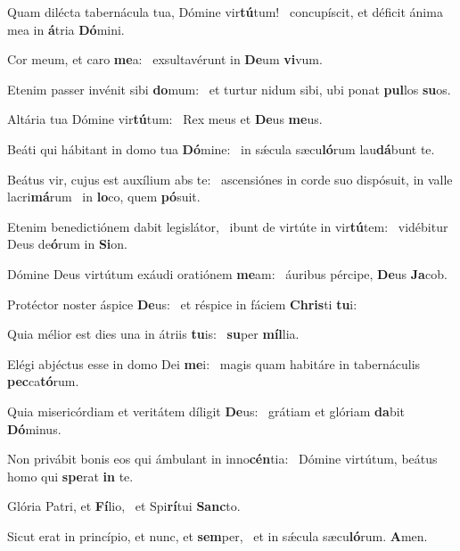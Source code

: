 \item Quam dilécta tabernácula tua, Dómine vir\textbf{tú}tum!~\psstar{} concupíscit, et déficit ánima mea in \textbf{á}tria \textbf{Dó}mini.
\item Cor meum, et caro \textbf{me}a:~\psstar{} exsultavérunt in \textbf{De}um \textbf{vi}vum.
\item Etenim passer invénit sibi \textbf{do}mum:~\psstar{} et turtur nidum sibi, ubi ponat \textbf{pul}los \textbf{su}os.
\item Altária tua Dómine vir\textbf{tú}\-tum:~\psstar{} Rex meus et \textbf{De}us \textbf{me}us.
\item Beáti qui hábitant in domo tua \textbf{Dó}mine:~\psstar{} in sǽcula sæcu\textbf{ló}rum lau\textbf{dá}bunt te.
\item Beátus vir, cujus est auxílium abs te:~\pscross{} ascensiónes in corde suo dispósuit, in valle lacri\textbf{má}rum~\psstar{} in \textbf{lo}co, quem \textbf{pó}suit.
\item Etenim benedictiónem dabit legislátor,~\pscross{} ibunt de virtúte in vir\textbf{tú}tem:~\psstar{} vidébitur Deus de\textbf{ó}rum in \textbf{Si}on.
\item Dómine Deus virtútum exáudi oratiónem \textbf{me}am:~\psstar{} áuribus pércipe, \textbf{De}us \textbf{Ja}cob.
\item Protéctor noster áspice \textbf{De}us:~\psstar{} et réspice in fáciem \textbf{Chris}ti \textbf{tu}i:
\item Quia mélior est dies una in átriis \textbf{tu}is:~\psstar{} \textbf{su}per \textbf{míl}lia.
\item Elégi abjéctus esse in domo Dei \textbf{me}i:~\psstar{} magis quam habitáre in tabernáculis \textbf{pec}ca\textbf{tó}rum.
\item Quia misericórdiam et veritátem díligit \textbf{De}us:~\psstar{} grátiam et glóriam \textbf{da}bit \textbf{Dó}minus.
\item Non privábit bonis eos qui ámbulant in inno\textbf{cén}tia:~\psstar{} Dómine virtútum, beátus homo qui \textbf{spe}rat \textbf{in} te.
\item Glória Patri, et \textbf{Fí}lio,~\psstar{} et Spi\textbf{rí}tui \textbf{Sanc}to.
\item Sicut erat in princípio, et nunc, et \textbf{sem}per,~\psstar{} et in sǽcula sæcu\textbf{ló}rum. \textbf{A}men.
